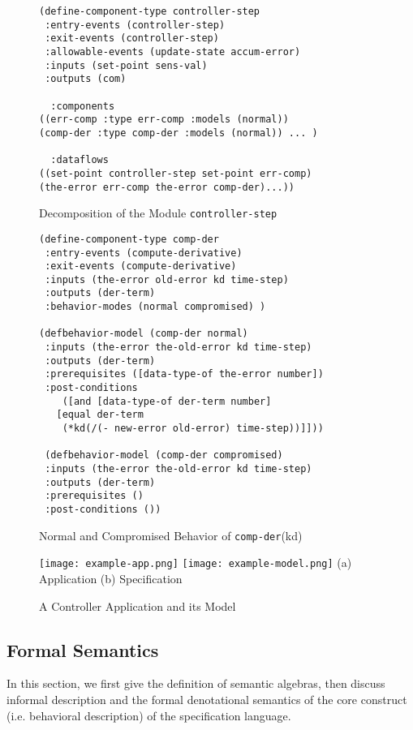 \documentclass[conference]{IEEEtran}
\begin{document}
\begin{figure}
{\small
\begin{verbatim}
(define-component-type controller-step
 :entry-events (controller-step)
 :exit-events (controller-step)
 :allowable-events (update-state accum-error)
 :inputs (set-point sens-val)
 :outputs (com)

  :components 
((err-comp :type err-comp :models (normal))
(comp-der :type comp-der :models (normal)) ... )

  :dataflows 
((set-point controller-step set-point err-comp)
(the-error err-comp the-error comp-der)...))
\end{verbatim}
}
\caption{Decomposition of the Module \texttt{controller-step}}
\label{fig:decomp-controller-example}
\end{figure}

\begin{figure}
{\small
\begin{verbatim}
(define-component-type comp-der
 :entry-events (compute-derivative)
 :exit-events (compute-derivative)
 :inputs (the-error old-error kd time-step)
 :outputs (der-term)
 :behavior-modes (normal compromised) )

(defbehavior-model (comp-der normal)
 :inputs (the-error the-old-error kd time-step)
 :outputs (der-term)
 :prerequisites ([data-type-of the-error number])
 :post-conditions 
 	([and [data-type-of der-term number]
   [equal der-term 
   	(*kd(/(- new-error old-error) time-step))]]))

 (defbehavior-model (comp-der compromised)
 :inputs (the-error the-old-error kd time-step)
 :outputs (der-term)
 :prerequisites ()
 :post-conditions ())
\end{verbatim}
}
\caption{Normal and Compromised Behavior of \texttt{comp-der}(kd)}
\label{fig:behave-comp-der-example}
\end{figure}



\begin{figure}
\centering
\texttt{[image: example-app.png]}
\texttt{[image: example-model.png]}
(a) Application \hspace*{2cm} (b) Specification
\caption{A Controller Application and its Model}
\label{fig:example}
\end{figure}


\subsection{Formal Semantics}\label{subsec:sam-semantics}
In this section, we first give the definition of semantic algebras, then discuss informal description and the formal denotational semantics of the core construct (i.e. behavioral description) of the specification language.
\end{document}
